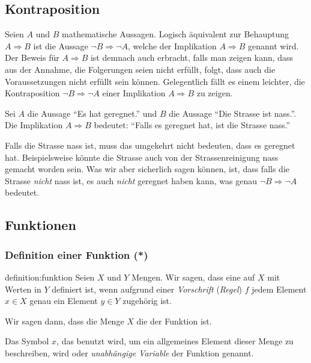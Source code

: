 \subsection{Kontraposition}
Seien $A$ und $B$ mathematische Aussagen. Logisch äquivalent zur Behauptung $A\Rightarrow B$ ist die Aussage $\neg{B}\Rightarrow \neg{A}$, welche  der Implikation $A\Rightarrow B$ genannt wird. Der Beweis für $A\Rightarrow B$ ist demnach auch erbracht, falls man zeigen kann, dass aus der Annahme, die Folgerungen seien nicht erfüllt, folgt, dass auch die Voraussetzungen nicht erfüllt sein können. Gelegentlich fällt es einem leichter, die Kontraposition $\neg{B}\Rightarrow \neg{A}$ einer Implikation $A\Rightarrow B$ zu zeigen.

\beispiel{-}
{Sei $A$ die Aussage \enquote{Es hat geregnet.} und $B$ die Aussage \enquote{Die Strasse ist nass.}. Die Implikation $A\Rightarrow B$ bedeutet: \enquote{Falls es geregnet hat, ist die Strasse nass.}

\noindent
Falls die Strasse nass ist, muss das umgekehrt nicht bedeuten, dass es geregnet hat. Beispielsweise könnte die Strasse auch von der Strassenreinigung nass gemacht worden sein. Was wir aber sicherlich sagen können, ist, dass falls die Strasse \textit{nicht} nass ist, es auch \textit{nicht} geregnet haben kann, was genau 
$\neg{B}\Rightarrow \neg{A}$ bedeutet.
}

\subsection{Funktionen}
\subsubsection{Definition einer Funktion (*)}
\begin{definition}{definition:funktion}
Seien $X$ und $Y$ Mengen. Wir sagen, dass eine  auf $X$ mit Werten in $Y$ definiert ist, wenn aufgrund einer \textit{Vorschrift} (\textit{Regel}) $f$ jedem Element $x\in X$ genau ein Element $y\in Y$ zugehörig ist.
\end{definition}
Wir sagen dann, dass die Menge $X$ die  der Funktion ist.

Das Symbol $x$, das benutzt wird, um ein allgemeines Element dieser Menge zu beschreiben, wird  oder \textit{unabhängige Variable} der Funktion genannt.

